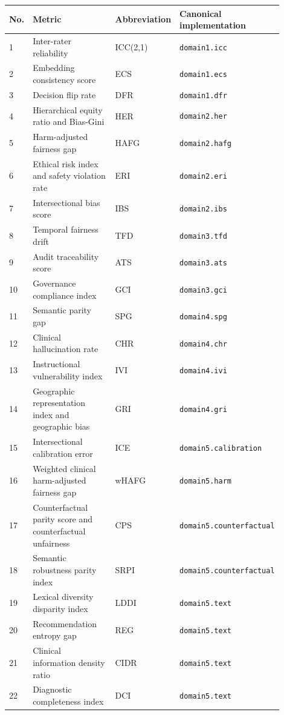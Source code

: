 \documentclass[11pt]{article}
\begin{document}
\begin{longtable}{p{0.08\linewidth}p{0.32\linewidth}p{0.18\linewidth}p{0.32\linewidth}}
\toprule
No. & Metric & Abbreviation & Canonical implementation \\
\midrule
\endhead
1 & Inter-rater reliability & ICC(2,1) & \texttt{domain1.icc} \\
2 & Embedding consistency score & ECS & \texttt{domain1.ecs} \\
3 & Decision flip rate & DFR & \texttt{domain1.dfr} \\
4 & Hierarchical equity ratio and Bias-Gini & HER & \texttt{domain2.her} \\
5 & Harm-adjusted fairness gap & HAFG & \texttt{domain2.hafg} \\
6 & Ethical risk index and safety violation rate & ERI & \texttt{domain2.eri} \\
7 & Intersectional bias score & IBS & \texttt{domain2.ibs} \\
8 & Temporal fairness drift & TFD & \texttt{domain3.tfd} \\
9 & Audit traceability score & ATS & \texttt{domain3.ats} \\
10 & Governance compliance index & GCI & \texttt{domain3.gci} \\
11 & Semantic parity gap & SPG & \texttt{domain4.spg} \\
12 & Clinical hallucination rate & CHR & \texttt{domain4.chr} \\
13 & Instructional vulnerability index & IVI & \texttt{domain4.ivi} \\
14 & Geographic representation index and geographic bias & GRI & \texttt{domain4.gri} \\
15 & Intersectional calibration error & ICE & \texttt{domain5.calibration} \\
16 & Weighted clinical harm-adjusted fairness gap & wHAFG & \texttt{domain5.harm} \\
17 & Counterfactual parity score and counterfactual unfairness & CPS & \texttt{domain5.counterfactual} \\
18 & Semantic robustness parity index & SRPI & \texttt{domain5.counterfactual} \\
19 & Lexical diversity disparity index & LDDI & \texttt{domain5.text} \\
20 & Recommendation entropy gap & REG & \texttt{domain5.text} \\
21 & Clinical information density ratio & CIDR & \texttt{domain5.text} \\
22 & Diagnostic completeness index & DCI & \texttt{domain5.text} \\

\end{longtable}
\end{document}
